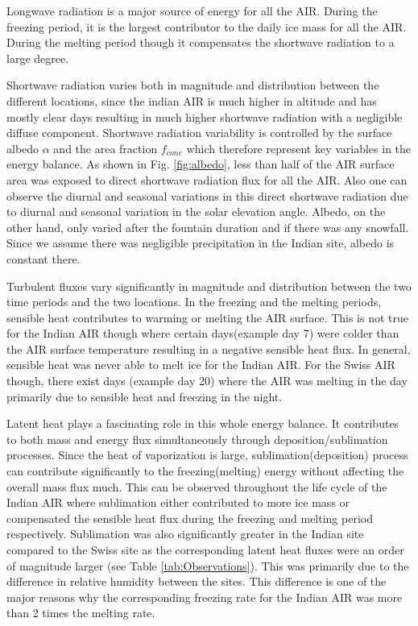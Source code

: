 \documentclass[utf8]{frontiersSCNS} %
\begin{document}
Longwave radiation is a major source of energy for all the AIR. During the freezing period, it is the largest
contributor to the daily ice mass for all the AIR. During the melting period though it compensates the shortwave
radiation to a large degree.

Shortwave radiation varies both in magnitude and distribution between the different locations, since the indian AIR is
much higher in altitude and has mostly clear days resulting in much higher shortwave radiation with a negligible
diffuse component.  Shortwave radiation variability is controlled by the surface albedo $\alpha$ and the area
fraction $f_{cone}$ which therefore represent key variables in the energy balance. As shown in Fig. \ref{fig:albedo},
less than half of the AIR surface area was exposed to direct shortwave radiation flux for all the AIR. Also one can
observe the diurnal and seasonal variations in this direct shortwave radiation due to diurnal and seasonal variation in
the solar elevation angle.  Albedo, on the other hand, only varied after the fountain duration and if there was any
snowfall. Since we assume there was negligible precipitation in the Indian site, albedo is constant there.

Turbulent fluxes vary significantly in magnitude and distribution between the two time periods and the two locations.
In the freezing and the melting periods, sensible heat contributes to warming or melting the AIR surface. This is not
true for the Indian AIR though where certain days(example day 7) were colder than the AIR surface temperature resulting
in a negative sensible heat flux. In general, sensible heat was never able to melt ice for the Indian AIR. For the Swiss
AIR though, there exist days (example day 20) where the AIR was melting in the day primarily due to sensible heat and
freezing in the night.

Latent heat plays a fascinating role in this whole energy balance. It contributes to both mass and energy flux
simultaneously through deposition/sublimation processes. Since the heat of vaporization is large,
sublimation(deposition) process can contribute significantly to the freezing(melting) energy without affecting the
overall mass flux much. This can be observed throughout the life cycle of the Indian AIR where sublimation either
contributed to more ice mass or compensated the sensible heat flux during the freezing and melting period respectively.
Sublimation was also significantly greater in the Indian site compared to the Swiss site as the corresponding latent heat
fluxes were an order of magnitude larger (see Table \ref{tab:Observations}). This was primarily due to the difference in
relative humidity between the sites. This difference is one of the major reasons why the corresponding freezing rate
for the Indian AIR was more than 2 times the melting rate.
\end{document}
